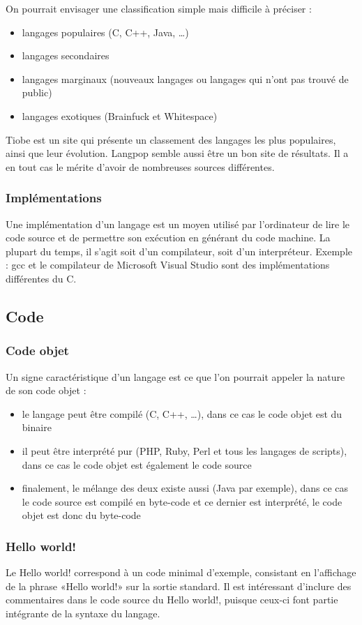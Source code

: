 On pourrait envisager une classification simple mais difficile à préciser :
\begin{itemize}
\item langages populaires (C, C++, Java, …)
\item langages secondaires
\item langages marginaux (nouveaux langages ou langages qui n'ont pas trouvé de public)
\item langages exotiques (Brainfuck et Whitespace)\\
\end{itemize}

Tiobe \cite{bib_tiobe} est un site qui présente un classement des langages les plus populaires, ainsi que leur évolution.
Langpop \cite{bib_langpop} semble aussi être un bon site de résultats. Il a en tout cas le mérite d'avoir de nombreuses sources différentes.

\subsubsection{Implémentations}
\label{implementations}

Une implémentation d'un langage est un moyen utilisé par l'ordinateur de lire le code source et de permettre son exécution en générant du code machine. La plupart du temps, il s'agit soit d'un compilateur, soit d'un interpréteur. Exemple : gcc et le compilateur de Microsoft Visual Studio sont des implémentations différentes du C. \cite{bib_compl}

\subsection{Code}
\label{code}

\subsubsection{Code objet}
\label{objet}

Un signe caractéristique d'un langage est ce que l'on pourrait appeler la nature de son code objet :
\begin{itemize}
\item le langage peut être compilé (C, C++, …), dans ce cas le code objet est du binaire
\item il peut être interprété pur (PHP, Ruby, Perl et tous les langages de scripts), dans ce cas le code objet est également le code source
\item finalement, le mélange des deux existe aussi (Java par exemple), dans ce cas le code source est compilé en byte-code et ce dernier est interprété, le code objet est donc du byte-code
\end{itemize}

\subsubsection{Hello world!}
\label{hello}

Le Hello world! correspond à un code minimal d'exemple, consistant en l'affichage de la phrase «Hello world!» sur la sortie standard. Il est intéressant d'inclure des commentaires dans le code source du Hello world!, puisque ceux-ci font partie intégrante de la syntaxe du langage.